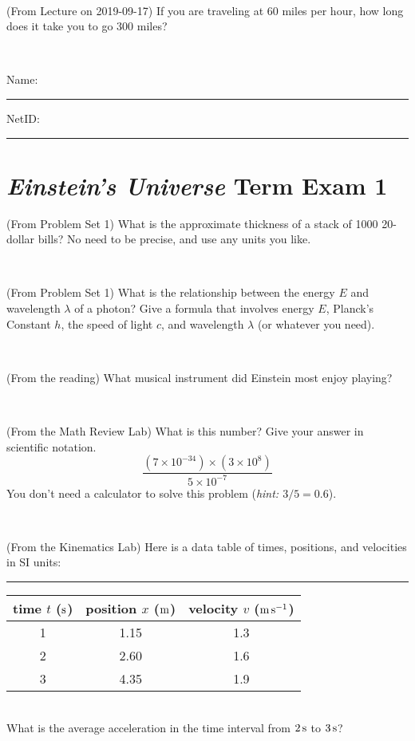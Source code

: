 \documentclass[12pt, letterpaper]{article}
\begin{document}
\vfill ~

\begin{problem} (From Lecture on 2019-09-17)
If you are traveling at 60 miles per hour, how long does
it take you to go 300 miles?
\end{problem}


\vfill ~


\cleardoublepage



\noindent
Name: \rule[-1ex]{0.60\textwidth}{0.1pt}
NetID: \rule[-1ex]{0.20\textwidth}{0.1pt}

\section*{\textsl{Einstein's Universe} Term Exam 1}
\setcounter{problem}{1}


\begin{problem} (From Problem Set 1)
What is the approximate thickness of a stack of 1000 20-dollar bills?
No need to be precise, and use any units you like.
\end{problem}


\vfill ~

\begin{problem} (From Problem Set 1)
What is the relationship between the energy $E$ and wavelength
$\lambda$ of a photon? Give a formula that involves energy $E$,
Planck's Constant $h$, the speed of light $c$, and wavelength
$\lambda$ (or whatever you need).
\end{problem}

\vfill ~

\begin{problem} (From the reading)
What musical instrument did Einstein most enjoy playing?
\end{problem}


\vfill ~

\begin{problem} (From the Math Review Lab)
What is this number? Give your answer in scientific notation.
$$
\frac{(7\times10^{-34})\times(3\times10^8)}{5\times10^{-7}}
$$
You don't need a calculator to solve this problem (\textit{hint: $3/5=0.6$}).
\end{problem}


\vfill ~


\clearpage


\begin{problem} (From the Kinematics Lab)
Here is a data table of times, positions, and velocities in SI units:\\
\rule{1.0in}{0pt}\begin{tabular}{c|c|c}
time $t$ ($\mathrm{s}$) & position $x$ ($\mathrm{m}$) & velocity $v$ ($\mathrm{m}\,\mathrm{s}^{-1}$) \\
\hline
1 & 1.15 & 1.3 \\
2 & 2.60 & 1.6 \\
3 & 4.35 & 1.9 \\
\hline
\end{tabular}\\
What is the average acceleration in the time interval from $2\,\mathrm{s}$ to $3\,\mathrm{s}$?
\end{problem}
\end{document}
